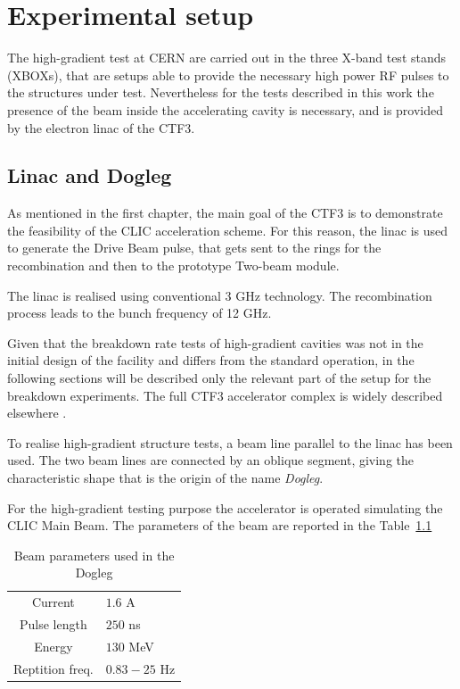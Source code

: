 \chapter[Experimental setup]{Experimental setup}

The high-gradient test at CERN are carried out in the three X-band test stands (XBOXs), that are setups able to provide the necessary high power RF pulses to the structures under test. Nevertheless for the tests described in this work the presence of the beam inside the accelerating cavity is necessary, and is provided by the electron linac of the CTF3. 


\section[Linac and dogleg]{Linac and Dogleg}

As mentioned in the first chapter, the main goal of the CTF3 is to demonstrate the feasibility of the CLIC acceleration scheme. For this reason, the linac is used to generate the Drive Beam pulse, that gets sent to the rings for the recombination and then to the prototype Two-beam module. 

The linac is realised using conventional 3 GHz technology. The recombination process leads to the bunch frequency of 12 GHz. 

Given that the breakdown rate tests of high-gradient cavities was not in the initial design of the facility and differs from the standard operation, in the following sections will be described only the relevant part of the setup for the breakdown experiments. The full CTF3 accelerator complex is widely described elsewhere \cite{CLIC:cdr,CTF:drive_beam,ctf3:dr}. 

To realise high-gradient structure tests, a beam line parallel to the linac has been used. The two beam lines are connected by an oblique segment, giving the characteristic shape that is the origin of the name \textit{Dogleg}.

For the high-gradient testing purpose the accelerator is operated simulating the CLIC Main Beam. The parameters of the beam are reported in the Table~\ref{beam_par_dogleg}


\begin{table}
  \centering
    \begin{tabular}{ c l }
    \hline
    \hline
    Current 		&	$1.6$ A\\
    Pulse length		&	$250$ ns\\
    Energy			&	$130$ MeV\\
    Reptition freq.	&	$0.83-25$ Hz\\
    \hline
    \hline
    \end{tabular}
\caption{Beam parameters used in the Dogleg \cite{NavarroQuirante:2025954}}
\label{beam_par_dogleg}
\end{table}



